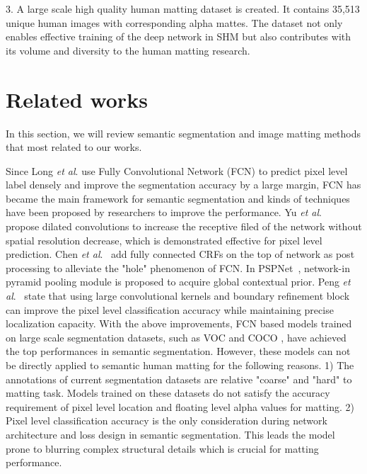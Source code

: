 3. A large scale high quality human matting dataset is created.
It contains 35,513 unique human images with corresponding alpha mattes.
The dataset not only enables effective training of the deep network in SHM but also contributes with its volume and diversity to the human matting research.

\section{Related works}



In this section, we will review semantic segmentation and image matting methods that most related to our works.

Since Long \emph{et al}. \cite{long2015fully} use Fully Convolutional Network (FCN) to predict pixel level label densely and improve the segmentation accuracy by a large margin, FCN has became the main framework for semantic segmentation and kinds of techniques have been proposed by researchers to improve the performance. Yu \emph{et al}.~\cite{yu2015multi} propose dilated convolutions to increase the receptive filed of the network without spatial resolution decrease, which is demonstrated effective for pixel level prediction. Chen \emph{et al}.~\cite{chen2016deeplab} add fully connected CRFs on the top of network as post processing to alleviate the "hole" phenomenon of FCN. In PSPNet~\cite{zhao2017pyramid}, network-in pyramid pooling module is proposed to acquire global contextual prior. Peng \emph{et al}.~\cite{peng2017large} state that using large convolutional kernels and boundary refinement block can improve the pixel level classification accuracy while maintaining precise localization capacity. With the above improvements, FCN based models trained on large scale segmentation datasets, such as VOC \cite{pascal-voc-2012} and COCO \cite{lin2014microsoft}, have achieved the top performances in semantic segmentation. However, these models can not be directly applied to semantic human matting for the following reasons.
1) The annotations of current segmentation datasets are relative "coarse" and "hard" to matting task. Models trained on these datasets do not satisfy the accuracy requirement of pixel level location and floating level alpha values for matting.
2) Pixel level classification accuracy is the only consideration during network architecture and loss design in semantic segmentation. This leads the model prone to blurring complex structural details which is crucial for matting performance.

